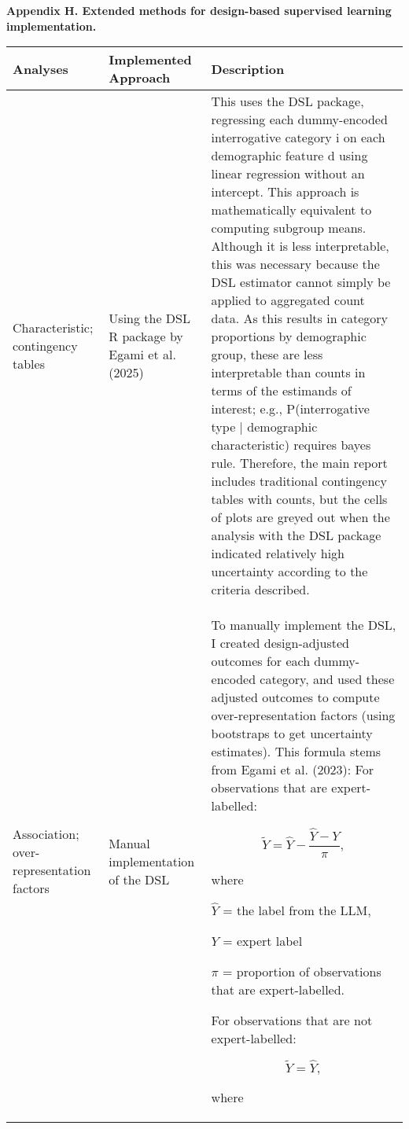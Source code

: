 \documentclass[11pt]{article}
\begin{document}
\begin{center}
\textbf{\large Appendix H. Extended methods for design-based supervised learning implementation.}
\end{center}

\vspace{1em}

{\small
\begin{tabular}{>{\raggedright\arraybackslash}p{2cm} >{\raggedright\arraybackslash}p{2cm} >{\raggedright\arraybackslash}p{13.0cm}}
\toprule
\textbf{Analyses} & \textbf{Implemented Approach} & \textbf{Description} \\
\midrule
Characteristic; contingency tables & Using the DSL R package by Egami et al. (2025)  & This uses the DSL package, regressing each dummy-encoded interrogative category i on 
each demographic feature d using linear regression without an intercept. This approach is mathematically equivalent to computing subgroup means. Although it is less interpretable, this was necessary because the DSL estimator cannot simply be applied to aggregated count data. As this results in category proportions by demographic group, these are less interpretable than counts in terms of the estimands of interest; e.g., P(interrogative type | demographic characteristic) requires bayes rule. Therefore, the main report includes traditional contingency tables with counts, but the cells of plots are greyed out when the analysis with the DSL package indicated relatively high uncertainty according to the criteria described. \\
\addlinespace[0.9em]
Association; over-representation factors & Manual implementation of the DSL & To manually implement the DSL, I created design-adjusted outcomes for each dummy-encoded category, and used these adjusted outcomes to compute over-representation factors (using bootstraps to get uncertainty estimates). This formula stems from Egami et al. (2023): 
For observations that are expert-labelled:

\[
\tilde{Y} = \hat{Y} - \frac{\hat{Y} - Y}{\pi},
\]

where

$\hat{Y}$ = the label from the LLM,

$Y$ = expert label

$\pi$ = proportion of observations that are expert-labelled.

For observations that are not expert-labelled:

\[
\tilde{Y} = \hat{Y},
\]

where


\end{tabular}}
\end{document}
